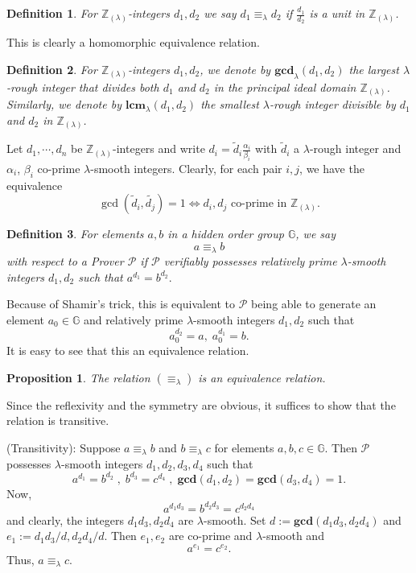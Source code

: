 \documentclass[11pt, lettersize, notitlepage, leqno, footskip=0.6cm]{article}
\newcommand{\bz}{\mathbb Z}
\newcommand{\LRA}{\Longleftrightarrow}
\newcommand{\eqlam}{\equiv_{\lam}}
\newcommand{\wti}{\widetilde}
\newcommand{\mc}{\mathcal}
\newcommand{\mb}{\mathbb}
\newcommand{\mbf}{\mathbf}
\newcommand{\al}{\alpha}
\newcommand{\be}{\beta}
\newcommand{\lam}{\lambda}
\newcommand{\lamb}{\lambda}
\newcommand{\bzlam}{\bz_{(\lam)}}
\newcommand{\vs}{\vspace{-0.15cm}}
\newcommand{\noin}{\noindent}
\newcommand{\LCM}{\mbf{lcm}}
\newcommand{\GCD}{\mbf{gcd}}
\newtheorem{Prop}[Thm]{Proposition}
\newtheorem{Def}{Definition}[section]
\numberwithin{equation}{section}
\begin{document}
\begin{Def} For $\bzlam$-integers $d_1,d_2$ we say $d_1\eqlam d_2$ if $\frac{d_1}{d_2}$ is a unit in $\bzlam$.\end{Def}

\noin This is clearly a homomorphic equivalence relation.

\begin{Def} For $\bzlam$-integers $d_1,d_2$, we denote by $\GCD_{\lam}(d_1,d_2)$ the largest $\lam$-rough integer that divides both $d_1$ and $d_2$ in the principal ideal domain $\bzlam$. Similarly, we denote by $\LCM_{\lam}(d_1,d_2)$ the smallest $\lam$-rough integer divisible by $d_1$ and $d_2$ in $\bzlam$.\end{Def}

\noin Let $d_1,\cdots,d_n$ be $\bzlam$-integers and write $d_i = \wti{d}_i\frac{\al_i}{\be_i}$ with $\wti{d}_i$ a $\lam$-rough integer and $\al_i$, $\be_i$ co-prime $\lam$-smooth integers. Clearly, for each pair $i,j$, we have the equivalence \vs $$\gcd(\wti{d}_i,\wti{d_j}) = 1\LRA d_i,d_j\text{ co-prime in }\bzlam. $$

\begin{Def} For elements $a, b$ in a hidden order group $\mb{G}$, we say \vs $$ a \equiv_{\lam} b$$ with respect to a Prover $\mc{P}$ if $\mc{P}$ verifiably possesses  relatively prime $\lamb$-smooth integers $d_1, d_2$ such that $a^{d_1} = b^{d_2}.$\end{Def}

\noindent Because of Shamir's trick, this is equivalent to $\mc{P}$ being able to generate an element $a_0\in \mb{G}$ and relatively prime $\lamb$-smooth integers $d_1, d_2$ such that \vs $$a_0^{d_2} = a, \; a_0^{d_1} = b.$$ It is easy to see that this an equivalence relation.

\begin{Prop} The relation $(\equiv_{\lam})$ is an equivalence relation.\end{Prop}

\begin{prf} Since the reflexivity and the symmetry are obvious, it suffices to show that the relation is transitive.

\noindent (Transitivity): Suppose $a \equiv_{\lam} b$ and $b \equiv_{\lam} c$ for elements $a, b, c\in\mb{G}$. Then $\mc{P}$ possesses $\lam$-smooth integers $d_1,d_2, d_3, d_4$ such that \vs $$a^{d_1} = b^{d_2}\;,\; b^{d_3} = c^{d_4}\;,\;\GCD(d_1,d_2) = \GCD(d_3,d_4) = 1.$$ Now, \vs $$a^{d_1d_3} = b^{d_2d_3} = c^{d_2 d_4}$$ and clearly, the integers $d_1d_3, d_2 d_4$ are $\lam$-smooth. Set $d:= \GCD(d_1d_3, d_2 d_4)$ and $e_1:= d_1d_3/d, d_2 d_4/d$. Then $e_1,e_2$ are co-prime and $\lam$-smooth and \vs $$ a^{e_1} = c^{e_2} .$$ Thus, $a \equiv_{\lam} c$.\end{prf}
\end{document}
